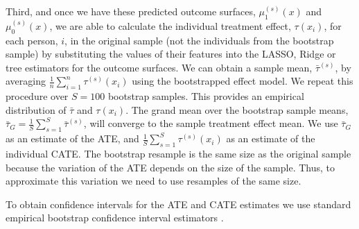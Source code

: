 \documentclass[12pt, a4paper]{article}
\begin{document}
Third, and once we have these predicted outcome surfaces, $\mu^{(s)}_1(x)$ and
$\mu^{(s)}_0(x)$, we are able to calculate the individual treatment effect,
$\tau(x_i)$, for each person, $i$, in the original sample (not the individuals
from the bootstrap sample) by substituting the values of their features into
the LASSO, Ridge or tree estimators for the outcome surfaces. We can obtain a
sample mean, $\bar{\tau}^{(s)}$, by averaging
$\frac{1}{n}\sum^n_{i{=}1}\tau^{(s)}(x_i)$ using the bootstrapped effect model.
We repeat this procedure over $S=100$ bootstrap samples. This provides an
empirical distribution of $\bar{\tau}$ and $\tau(x_i)$. The grand mean over the
bootstrap sample means, $\bar{\tau}_G = \frac{1}{S} \sum^S_{s{=1}}
\bar{\tau}^{(s)}$, will converge to the sample treatment effect mean. We use
$\bar{\tau}_G$ as an estimate of the ATE, and $\frac{1}{S} \sum^S_{s{=}1}
\tau^{(s)}(x_i)$ as an estimate of the individual CATE. The bootstrap resample
is the same size as the original sample because the variation of the ATE
depends on the size of the sample. Thus, to approximate this variation we need
to use resamples of the same size.



To obtain confidence intervals for the ATE and CATE estimates we use standard
empirical bootstrap confidence interval estimators \citep{efron1986}.

\end{document}
